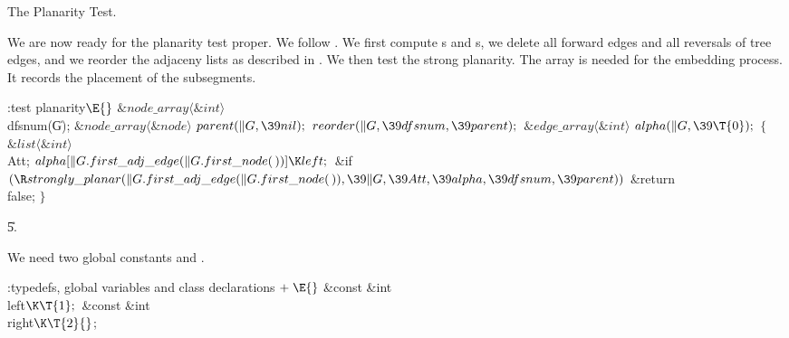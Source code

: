 The Planarity Test.

We are now ready for the planarity test proper. We follow
\cite[page 95]{Me:book}. We first compute s and s, we
delete all forward edges and all reversals of tree edges, and we
reorder the adjaceny lists as described in \cite[page 101]{Me:book}.
We then test the strong planarity.
The array  is needed for the embedding process. It
records the placement of the subsegments.



\Y\B\4:test planarity\X${}\E{}$\6
$\&{node\_array}\langle\&{int}\rangle{}$ \\{dfsnum}(\|G);\6
${}\&{node\_array}\langle\&{node}\rangle{}$ ${}\\{parent}(\|G,\39\\{nil});{}$\7
${}\\{reorder}(\|G,\39\\{dfsnum},\39\\{parent});{}$\7
${}\&{edge\_array}\langle\&{int}\rangle{}$ ${}\\{alpha}(\|G,\39\T{0});{}$\7
${}\{{}$\1\6
${}\&{list}\langle\&{int}\rangle{}$ \\{Att};\7
${}\\{alpha}[\|G.\\{first\_adj\_edge}(\|G.\\{first\_node}(\,))]\K\\{left};{}$\6
\&{if} ${}(\R\\{strongly\_planar}(\|G.\\{first\_adj\_edge}(\|G.\\{first\_node}(%
\,)),\39\|G,\39\\{Att},\39\\{alpha},\39\\{dfsnum},\39\\{parent})){}$\1\5
\&{return} \\{false};\2\6
\4${}\}{}$\2\par
\U5.\fi

We need two global constants  and .

\Y\B\4:typedefs, global variables and class declarations\X${}\mathrel+\E{}$%
\6
\&{const} \&{int} \\{left}${}\K\T{1};{}$\6
\&{const} \&{int} \\{right}${}\K\T{2}{}$;\par
\fi

